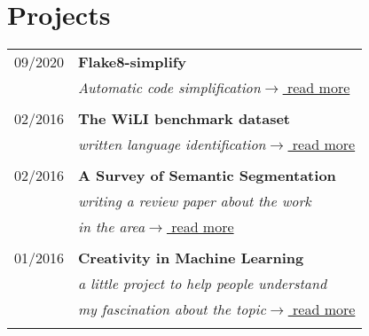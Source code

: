 \documentclass[a4paper,10pt]{article} %
\begin{document}
{\begin{minipage}[t]{0.5\textwidth}
\end{minipage} %
\hfill
\begin{minipage}[t]{0.44\textwidth}
\vspace{0pt} %


\section{Projects}



\begin{tabular}{rl}
09/2020  & \textbf{Flake8-simplify}\\
& \textit{Automatic code simplification}\hfill \href{https://github.com/MartinThoma/flake8-simplify}{$\rightarrow$ read more}\\ \\

02/2016  & \textbf{The WiLI benchmark dataset}\\
& \textit{written language identification}\hfill \href{https://arxiv.org/abs/1801.07779}{$\rightarrow$ read more}\\ \\

02/2016  & \textbf{A Survey of Semantic Segmentation}\\
& \textit{writing a review paper about the work }\\
& \textit{in the area}\hfill \href{https://arxiv.org/abs/1602.06541}{$\rightarrow$ read more}\\ \\

01/2016  & \textbf{Creativity in Machine Learning}\\
& \textit{a little project to help people understand}\\
& \textit{my fascination about the topic}\hfill \href{https://arxiv.org/abs/1601.03642}{$\rightarrow$ read more}\\ \\


\end{tabular}
\end{minipage}}
\end{document}
